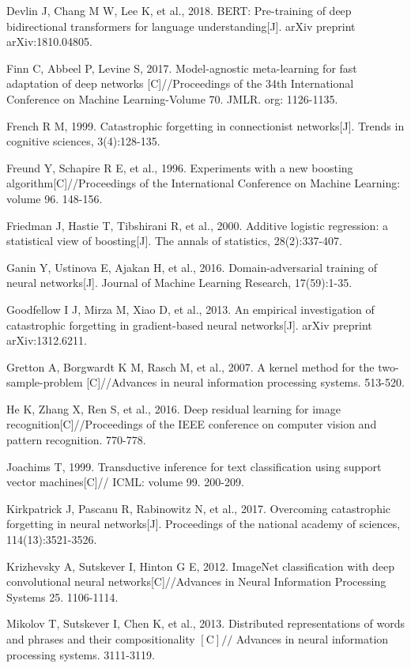 \documentclass[10pt]{article}
\begin{document}
Devlin J, Chang M W, Lee K, et al., 2018. BERT: Pre-training of deep bidirectional transformers for language understanding[J]. arXiv preprint arXiv:1810.04805.

Finn C, Abbeel P, Levine S, 2017. Model-agnostic meta-learning for fast adaptation of deep networks [C]//Proceedings of the 34th International Conference on Machine Learning-Volume 70. JMLR. org: 1126-1135.

French R M, 1999. Catastrophic forgetting in connectionist networks[J]. Trends in cognitive sciences, 3(4):128-135.

Freund Y, Schapire R E, et al., 1996. Experiments with a new boosting algorithm[C]//Proceedings of the International Conference on Machine Learning: volume 96. 148-156.

Friedman J, Hastie T, Tibshirani R, et al., 2000. Additive logistic regression: a statistical view of boosting[J]. The annals of statistics, 28(2):337-407.

Ganin Y, Ustinova E, Ajakan H, et al., 2016. Domain-adversarial training of neural networks[J]. Journal of Machine Learning Research, 17(59):1-35.

Goodfellow I J, Mirza M, Xiao D, et al., 2013. An empirical investigation of catastrophic forgetting in gradient-based neural networks[J]. arXiv preprint arXiv:1312.6211.

Gretton A, Borgwardt K M, Rasch M, et al., 2007. A kernel method for the two-sample-problem [C]//Advances in neural information processing systems. 513-520.

He K, Zhang X, Ren S, et al., 2016. Deep residual learning for image recognition[C]//Proceedings of the IEEE conference on computer vision and pattern recognition. 770-778.

Joachims T, 1999. Transductive inference for text classification using support vector machines[C]// ICML: volume 99. 200-209.

Kirkpatrick J, Pascanu R, Rabinowitz N, et al., 2017. Overcoming catastrophic forgetting in neural networks[J]. Proceedings of the national academy of sciences, 114(13):3521-3526.

Krizhevsky A, Sutskever I, Hinton G E, 2012. ImageNet classification with deep convolutional neural networks[C]//Advances in Neural Information Processing Systems 25. 1106-1114.

Mikolov T, Sutskever I, Chen K, et al., 2013. Distributed representations of words and phrases and their compositionality $[\mathrm{C}] / /$ Advances in neural information processing systems. 3111-3119.
\end{document}
